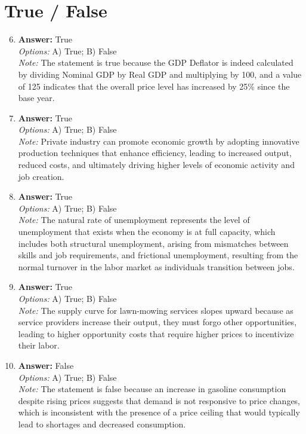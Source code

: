 \documentclass[12pt]{article}
\begin{document}
\section*{True / False}
\begin{enumerate}[label=\arabic*.]
\setcounter{enumi}{5}
\item \textbf{Answer:} True
\\ \textit{Options:} A) True; B) False
\\ \textit{Note:} The statement is true because the GDP Deflator is indeed calculated by dividing Nominal GDP by Real GDP and multiplying by 100, and a value of 125 indicates that the overall price level has increased by 25\% since the base year.
\item \textbf{Answer:} True
\\ \textit{Options:} A) True; B) False
\\ \textit{Note:} Private industry can promote economic growth by adopting innovative production techniques that enhance efficiency, leading to increased output, reduced costs, and ultimately driving higher levels of economic activity and job creation.
\item \textbf{Answer:} True
\\ \textit{Options:} A) True; B) False
\\ \textit{Note:} The natural rate of unemployment represents the level of unemployment that exists when the economy is at full capacity, which includes both structural unemployment, arising from mismatches between skills and job requirements, and frictional unemployment, resulting from the normal turnover in the labor market as individuals transition between jobs.
\item \textbf{Answer:} True
\\ \textit{Options:} A) True; B) False
\\ \textit{Note:} The supply curve for lawn-mowing services slopes upward because as service providers increase their output, they must forgo other opportunities, leading to higher opportunity costs that require higher prices to incentivize their labor.
\item \textbf{Answer:} False
\\ \textit{Options:} A) True; B) False
\\ \textit{Note:} The statement is false because an increase in gasoline consumption despite rising prices suggests that demand is not responsive to price changes, which is inconsistent with the presence of a price ceiling that would typically lead to shortages and decreased consumption.
\end{enumerate}
\end{document}

